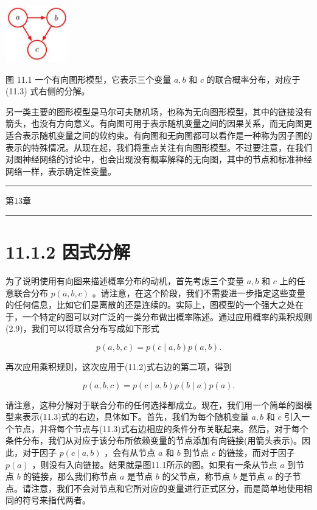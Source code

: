 \documentclass[10pt]{article}
\newcommand{\HRule}{\begin{center}\rule{0.9\linewidth}{0.2mm}\end{center}}
\begin{document}
\begin{center}
\includegraphics[max width=0.2\textwidth]{images/0194e279-9b28-703a-88f4-c3ac21e2010d_346_1340_347_208_194_0.jpg}
\end{center}
\hspace*{3em} 

图 11.1 一个有向图形模型，它表示三个变量 \(a,b\) 和 \(c\) 的联合概率分布，对应于 (11.3) 式右侧的分解。

另一类主要的图形模型是马尔可夫随机场，也称为无向图形模型，其中的链接没有箭头，也没有方向意义。有向图可用于表示随机变量之间的因果关系，而无向图更适合表示随机变量之间的软约束。有向图和无向图都可以看作是一种称为因子图的表示的特殊情况。从现在起，我们将重点关注有向图形模型。不过要注意，在我们对图神经网络的讨论中，也会出现没有概率解释的无向图，其中的节点和标准神经网络一样，表示确定性变量。

\HRule

第13章

\HRule

\section*{11.1.2 因式分解}

为了说明使用有向图来描述概率分布的动机，首先考虑三个变量 \(a,b\) 和 \(c\) 上的任意联合分布 \(p\left( {a,b,c}\right)\) 。请注意，在这个阶段，我们不需要进一步指定这些变量的任何信息，比如它们是离散的还是连续的。实际上，图模型的一个强大之处在于，一个特定的图可以对广泛的一类分布做出概率陈述。通过应用概率的乘积规则(2.9)，我们可以将联合分布写成如下形式

\[
p\left( {a,b,c}\right)  = p\left( {c \mid  a,b}\right) p\left( {a,b}\right) . \tag{11.2}
\]

再次应用乘积规则，这次应用于(11.2)式右边的第二项，得到

\[
p\left( {a,b,c}\right)  = p\left( {c \mid  a,b}\right) p\left( {b \mid  a}\right) p\left( a\right) . \tag{11.3}
\]

请注意，这种分解对于联合分布的任何选择都成立。现在，我们用一个简单的图模型来表示(11.3)式的右边，具体如下。首先，我们为每个随机变量 \(a,b\) 和 \(c\) 引入一个节点，并将每个节点与(11.3)式右边相应的条件分布关联起来。然后，对于每个条件分布，我们从对应于该分布所依赖变量的节点添加有向链接(用箭头表示)。因此，对于因子 \(p\left( {c \mid  a,b}\right)\) ，会有从节点 \(a\) 和 \(b\) 到节点 \(c\) 的链接，而对于因子 \(p\left( a\right)\) ，则没有入向链接。结果就是图11.1所示的图。如果有一条从节点 \(a\) 到节点 \(b\) 的链接，那么我们称节点 \(a\) 是节点 \(b\) 的父节点，称节点 \(b\) 是节点 \(a\) 的子节点。请注意，我们不会对节点和它所对应的变量进行正式区分，而是简单地使用相同的符号来指代两者。
\end{document}

